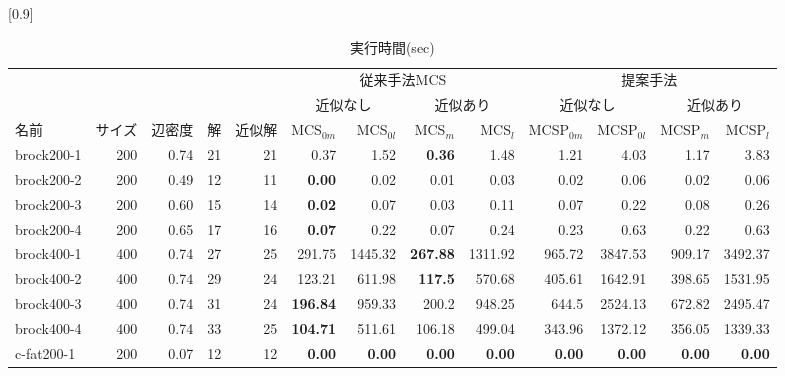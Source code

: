\begin{table}
\centering
    \caption{実行時間(sec)}
    \label{tab:result_sec}
\scalebox{0.8}[0.9]{ %
\scriptsize
\begin{tabular}{|l|r|r|r|r|r|r|r|r||r|r|r|r|}
\hline
	  \multicolumn{5}{|c|}{ \multirow{2}{*}{入力グラフデータ} }
	& \multicolumn{4}{c||}{従来手法MCS} & \multicolumn{4}{c|}{提案手法}\\ \cline{6-13} 
	 \multicolumn{5}{|c|}{} & \multicolumn{2}{c|}{近似なし} & \multicolumn{2}{c||}{近似あり} & \multicolumn{2}{c|}{近似なし} & \multicolumn{2}{c|}{近似あり} \\ \hline
    \multicolumn{1}{|l|}{名前} & \multicolumn{1}{l|}{サイズ} & \multicolumn{1}{c|}{辺密度}& \multicolumn{1}{c|}{解} &\multicolumn{1}{l|}{近似解}& MCS$_{0m}$ & MCS$_{0l}$ & MCS$_m$ & MCS$_l$ & MCSP$_{0m}$ & MCSP$_{0l}$ & MCSP$_m$ & MCSP$_l$\\ \hline
    \hline
    brock200-1 & 200 &0.74& 21 &21& 0.37 & 1.52 & \textbf{0.36} & 1.48 &  1.21 & 4.03 & 1.17 & 3.83 \\ \hline
    brock200-2 & 200 &0.49& 12 &11 & \textbf{0.00} & 0.02 & 0.01 & 0.03 & 0.02 & 0.06 & 0.02 & 0.06 \\ \hline
    brock200-3 & 200 &0.60& 15 &14& \textbf{0.02} & 0.07 & 0.03 & 0.11 & 0.07 & 0.22 & 0.08 & 0.26 \\ \hline
    brock200-4 & 200 &0.65& 17 & 16&\textbf{0.07} & 0.22 & 0.07 & 0.24 & 0.23 & 0.63 & 0.22 & 0.63 \\ \hline
    brock400-1 & 400 &0.74& 27 &25& 291.75 & 1445.32 & \textbf{267.88} & 1311.92 & 965.72 & 3847.53 & 909.17 & 3492.37 \\ \hline
    brock400-2 & 400 &0.74& 29 & 24&123.21 & 611.98 & \textbf{117.5} & 570.68 & 405.61 & 1642.91 & 398.65 & 1531.95 \\ \hline
    brock400-3 & 400 &0.74& 31 & 24&\textbf{196.84} & 959.33 & 200.2 & 948.25 & 644.5 & 2524.13 & 672.82 & 2495.47 \\ \hline
    brock400-4 & 400 &0.74& 33 & 25&\textbf{104.71} & 511.61 & 106.18 & 499.04 & 343.96 & 1372.12 & 356.05 & 1339.33 \\ \hline
    c-fat200-1 & 200 &0.07& 12 & 12&\textbf{0.00} & \textbf{0.00} & \textbf{0.00} & \textbf{0.00} & \textbf{0.00} & \textbf{0.00} & \textbf{0.00} & \textbf{0.00} \\ \hline

\end{tabular}}
\end{table}
